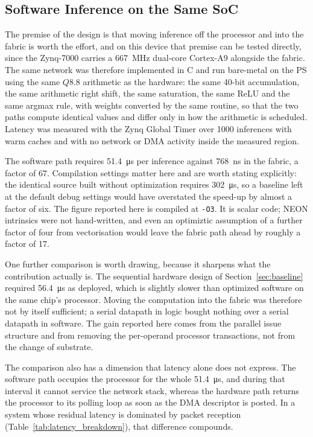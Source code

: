 \documentclass[final,5p,times,twocolumn]{elsarticle}
\begin{document}
\subsection{Software Inference on the Same SoC}
\label{sec:arm_baseline}
The premise of the design is that moving inference off the processor and into
the fabric is worth the effort, and on this device that premise can be tested
directly, since the Zynq-7000 carries a \SI{667}{\mega\hertz} dual-core
Cortex-A9 alongside the fabric. The same network was therefore implemented in C
and run bare-metal on the PS using the same $Q8.8$ arithmetic as the hardware:
the same 40-bit accumulation, the same arithmetic right shift, the same
saturation, the same ReLU and the same argmax rule, with weights converted by
the same routine, so that the two paths compute identical values and differ only
in how the arithmetic is scheduled. Latency was measured with the Zynq Global
Timer over \num{1000} inferences with warm caches and with no network or DMA
activity inside the measured region.

The software path requires \SI{51.4}{\micro\second} per inference against
\SI{768}{\nano\second} in the fabric, a factor of $67$. Compilation settings
matter here and are worth stating explicitly: the identical source built without
optimization requires \SI{302}{\micro\second}, so a baseline left at the default
debug settings would have overstated the speed-up by almost a factor of six. The
figure reported here is compiled at \texttt{-O3}. It is scalar code; NEON
intrinsics were not hand-written, and even an optimiztic assumption of a further
factor of four from vectorisation would leave the fabric path ahead by roughly a
factor of 17.

One further comparison is worth drawing, because it sharpens what the
contribution actually is. The sequential hardware design of
Section~\ref{sec:baseline} required \SI{56.4}{\micro\second} as deployed, which
is slightly slower than optimized software on the same chip's processor. Moving
the computation into the fabric was therefore not by itself sufficient; a serial
datapath in logic bought nothing over a serial datapath in software. The gain
reported here comes from the parallel issue structure and from removing the
per-operand processor transactions, not from the change of substrate.

The comparison also has a dimension that latency alone does not express. The
software path occupies the processor for the whole \SI{51.4}{\micro\second}, and
during that interval it cannot service the network stack, whereas the hardware
path returns the processor to its polling loop as soon as the DMA descriptor is
posted. In a system whose residual latency is dominated by packet reception
(Table~\ref{tab:latency_breakdown}), that difference compounds.
\end{document}
